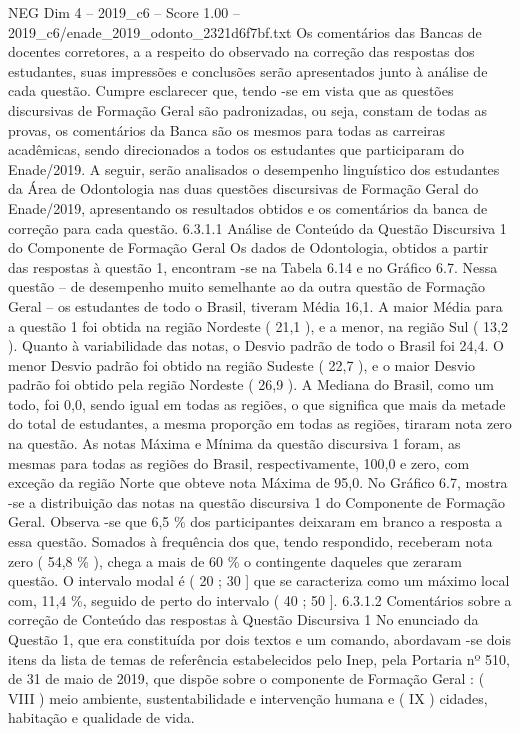 \begin{textsample}{NEG Dim 4 – 2019\_c6 – Score 1.00 – 2019\_c6/enade\_2019\_odonto\_2321d6f7bf.txt}
Os comentários das Bancas de docentes corretores, a a respeito do observado na correção das respostas dos estudantes, suas impressões e conclusões serão apresentados junto à análise de cada questão.
Cumpre esclarecer que, tendo -se em vista que as questões discursivas de Formação Geral são padronizadas, ou seja, constam de todas as provas, os comentários da Banca são os mesmos para todas as carreiras acadêmicas, sendo direcionados a todos os estudantes que participaram do Enade/2019.
A seguir, serão analisados o desempenho linguístico dos estudantes da Área de Odontologia nas duas questões discursivas de Formação Geral do Enade/2019, apresentando os resultados obtidos e os comentários da banca de correção para cada questão. 6.3.1.1 Análise de Conteúdo da Questão Discursiva 1 do Componente de Formação Geral Os dados de Odontologia, obtidos a partir das respostas à questão 1, encontram -se na Tabela 6.14 e no Gráfico 6.7.
Nessa questão – de desempenho muito semelhante ao da outra questão de Formação Geral – os estudantes de todo o Brasil, tiveram Média 16,1.
A maior Média para a questão 1 foi obtida na região Nordeste ( 21,1 ), e a menor, na região Sul ( 13,2 ).
Quanto à variabilidade das notas, o Desvio padrão de todo o Brasil foi 24,4.
O menor Desvio padrão foi obtido na região Sudeste ( 22,7 ), e o maior Desvio padrão foi obtido pela região Nordeste ( 26,9 ).
A Mediana do Brasil, como um todo, foi 0,0, sendo igual em todas as regiões, o que significa que mais da metade do total de estudantes, a mesma proporção em todas as regiões, tiraram nota zero na questão.
As notas Máxima e Mínima da questão discursiva 1 foram, as mesmas para todas as regiões do Brasil, respectivamente, 100,0 e zero, com exceção da região Norte que obteve nota Máxima de 95,0.
No Gráfico 6.7, mostra -se a distribuição das notas na questão discursiva 1 do Componente de Formação Geral.
Observa -se que 6,5 \% dos participantes deixaram em branco a resposta a essa questão.
Somados à frequência dos que, tendo respondido, receberam nota zero ( 54,8 \% ), chega a mais de 60 \% o contingente daqueles que zeraram questão.
O intervalo modal é ( 20 ; 30 ] que se caracteriza como um máximo local com, 11,4 \%, seguido de perto do intervalo ( 40 ; 50 ]. 6.3.1.2 Comentários sobre a correção de Conteúdo das respostas à Questão Discursiva 1 No enunciado da Questão 1, que era constituída por dois textos e um comando, abordavam -se dois itens da lista de temas de referência estabelecidos pelo Inep, pela Portaria nº 510, de 31 de maio de 2019, que dispõe sobre o componente de Formação Geral : ( VIII ) meio ambiente, sustentabilidade e intervenção humana e ( IX ) cidades, habitação e qualidade de vida.

\end{textsample}
